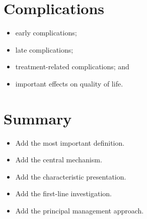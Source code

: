 \section{Complications}

\begin{itemize}
    \item early complications;
    \item late complications;
    \item treatment-related complications; and
    \item important effects on quality of life.
\end{itemize}

\section{Summary}

\begin{keypoint}
\begin{itemize}
    \item Add the most important definition.
    \item Add the central mechanism.
    \item Add the characteristic presentation.
    \item Add the first-line investigation.
    \item Add the principal management approach.
\end{itemize}
\end{keypoint}

